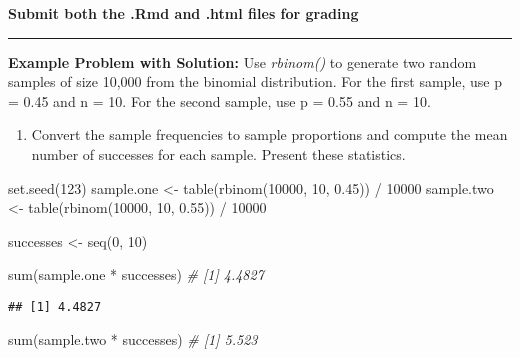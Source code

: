 \documentclass[
]{article}
\newenvironment{Shaded}{\begin{snugshade}}{\end{snugshade}}
\newcommand{\CommentTok}[1]{\textcolor[rgb]{0.56,0.35,0.01}{\textit{#1}}}
\newcommand{\DecValTok}[1]{\textcolor[rgb]{0.00,0.00,0.81}{#1}}
\newcommand{\FloatTok}[1]{\textcolor[rgb]{0.00,0.00,0.81}{#1}}
\newcommand{\FunctionTok}[1]{\textcolor[rgb]{0.00,0.00,0.00}{#1}}
\newcommand{\NormalTok}[1]{#1}
\newcommand{\OtherTok}[1]{\textcolor[rgb]{0.56,0.35,0.01}{#1}}
\newcommand{\SpecialCharTok}[1]{\textcolor[rgb]{0.00,0.00,0.00}{#1}}
\providecommand{\tightlist}{%
  \setlength{\itemsep}{0pt}\setlength{\parskip}{0pt}}
\begin{document}
\textbf{Submit both the .Rmd and .html files for grading}

\begin{center}\rule{0.5\linewidth}{0.5pt}\end{center}

\textbf{Example Problem with Solution:} Use \emph{rbinom()} to generate
two random samples of size 10,000 from the binomial distribution. For
the first sample, use p = 0.45 and n = 10. For the second sample, use p
= 0.55 and n = 10.

\begin{enumerate}
\def\labelenumi{(\alph{enumi})}
\tightlist
\item
  Convert the sample frequencies to sample proportions and compute the
  mean number of successes for each sample. Present these statistics.
\end{enumerate}

\begin{Shaded}
\begin{Highlighting}[]
\FunctionTok{set.seed}\NormalTok{(}\DecValTok{123}\NormalTok{)}
\NormalTok{sample.one }\OtherTok{\textless{}{-}} \FunctionTok{table}\NormalTok{(}\FunctionTok{rbinom}\NormalTok{(}\DecValTok{10000}\NormalTok{, }\DecValTok{10}\NormalTok{, }\FloatTok{0.45}\NormalTok{)) }\SpecialCharTok{/} \DecValTok{10000}
\NormalTok{sample.two }\OtherTok{\textless{}{-}} \FunctionTok{table}\NormalTok{(}\FunctionTok{rbinom}\NormalTok{(}\DecValTok{10000}\NormalTok{, }\DecValTok{10}\NormalTok{, }\FloatTok{0.55}\NormalTok{)) }\SpecialCharTok{/} \DecValTok{10000}

\NormalTok{successes }\OtherTok{\textless{}{-}} \FunctionTok{seq}\NormalTok{(}\DecValTok{0}\NormalTok{, }\DecValTok{10}\NormalTok{)}

\FunctionTok{sum}\NormalTok{(sample.one }\SpecialCharTok{*}\NormalTok{ successes) }\CommentTok{\# [1] 4.4827}
\end{Highlighting}
\end{Shaded}

\begin{verbatim}
## [1] 4.4827
\end{verbatim}

\begin{Shaded}
\begin{Highlighting}[]
\FunctionTok{sum}\NormalTok{(sample.two }\SpecialCharTok{*}\NormalTok{ successes) }\CommentTok{\# [1] 5.523}
\end{Highlighting}
\end{Shaded}
\end{document}
